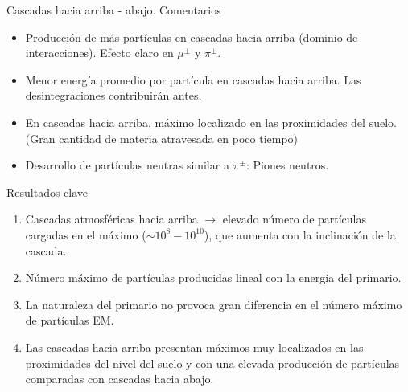 \documentclass{beamer}
\begin{document}
\begin{frame}{Cascadas hacia arriba - abajo. Comentarios}
	\begin{itemize}
		\item Producción de más partículas en cascadas hacia arriba (dominio de interacciones). Efecto claro en $\mu^\pm$ y $\pi^\pm$.
		\item Menor energía promedio por partícula en cascadas hacia arriba. Las desintegraciones contribuirán antes.
		\item En cascadas hacia arriba, máximo localizado en las proximidades del suelo. (Gran cantidad de materia atravesada en poco tiempo)
		\item Desarrollo de partículas neutras similar a $\pi^\pm$: Piones neutros.
	\end{itemize}
\end{frame}
\begin{frame}{Resultados clave}
	\begin{enumerate}
		\item Cascadas atmosféricas hacia arriba $\rightarrow$ elevado número de partículas cargadas en el máximo ($\sim 10^8-10^{10}$), que aumenta con la inclinación de la cascada. 
	\item Número máximo de partículas producidas lineal con la energía del primario. 
	\item La naturaleza del primario no provoca gran diferencia en el número máximo de partículas EM.
	\item Las cascadas hacia arriba presentan máximos muy localizados en las proximidades del nivel del suelo y con una elevada producción de partículas comparadas con cascadas hacia abajo.
	\end{enumerate}
\end{frame}
\end{document}
